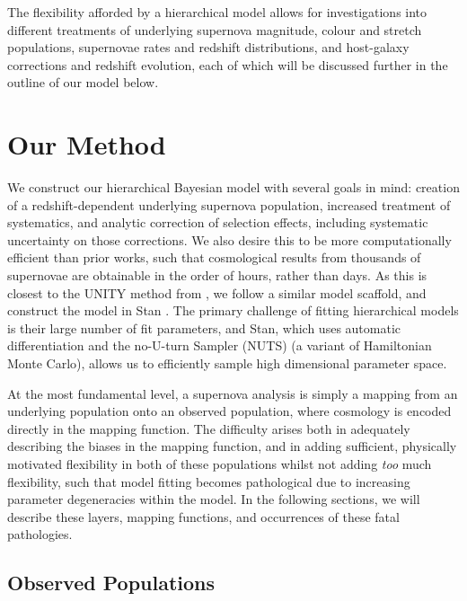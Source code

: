\documentclass[a4paper,fleqn,usenatbib]{mnras}
\newcommand{\rubin}{\citetalias{Rubin2015}}
\begin{document}
The flexibility afforded by a hierarchical model allows for investigations into different treatments of underlying supernova magnitude, colour and stretch populations, supernovae rates and redshift distributions, and host-galaxy corrections and redshift evolution, each of which will be discussed further in the outline of our model below. 









\section{Our Method}
\label{sec:method}

We construct our hierarchical Bayesian model with several goals in mind: creation of a redshift-dependent underlying supernova population, increased treatment of systematics, and analytic correction of selection effects, including systematic uncertainty on those corrections. We also desire this to be more computationally efficient than prior works, such that cosmological results from thousands of supernovae are obtainable in the order of hours, rather than days. As this is closest to the UNITY method from \citet[][hereafter denoted \rubin]{Rubin2015}, we follow a similar model scaffold, and construct the model in Stan \citep{Carpenter2017, StanDevelopmentTeam2017}. The primary challenge of fitting hierarchical models is their large number of fit parameters, and Stan, which uses automatic differentiation and the no-U-turn Sampler (NUTS) (a variant of Hamiltonian Monte Carlo), allows us to efficiently sample high dimensional parameter space.

At the most fundamental level, a supernova analysis is simply a mapping from an underlying population onto an observed population, where cosmology is encoded directly in the mapping function. The difficulty arises both in adequately describing the biases in the mapping function, and in adding sufficient, physically motivated flexibility in both of these populations whilst not adding \textit{too} much flexibility, such that model fitting becomes pathological due to increasing parameter degeneracies within the model. In the following sections, we will describe these layers, mapping functions, and occurrences of these fatal pathologies.


\subsection{Observed Populations}
\end{document}

